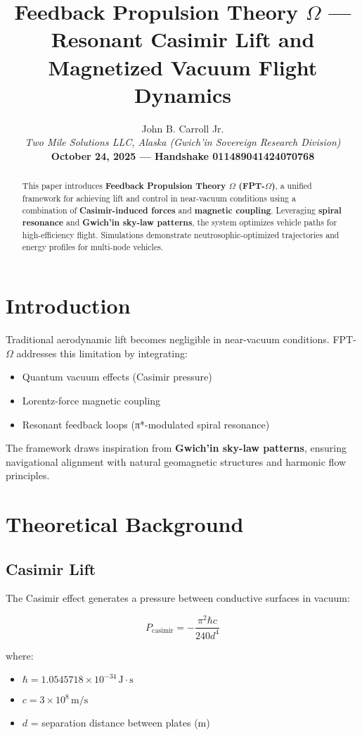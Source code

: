 \documentclass[12pt]{article}
\title{Feedback Propulsion Theory $\Omega$ — Resonant Casimir Lift and Magnetized Vacuum Flight Dynamics}
\author{John B. Carroll Jr.\\
\textit{Two Mile Solutions LLC, Alaska (Gwich’in Sovereign Research Division)}\\
\textbf{October 24, 2025 — Handshake 011489041424070768}}
\date{}
\begin{document}
\maketitle

\begin{abstract}
This paper introduces \textbf{Feedback Propulsion Theory $\Omega$ (FPT-$\Omega$)}, a unified framework for achieving lift and control in near-vacuum conditions using a combination of \textbf{Casimir-induced forces} and \textbf{magnetic coupling}. Leveraging \textbf{spiral resonance} and \textbf{Gwich’in sky-law patterns}, the system optimizes vehicle paths for high-efficiency flight. Simulations demonstrate neutrosophic-optimized trajectories and energy profiles for multi-node vehicles.
\end{abstract}

\section{Introduction}
Traditional aerodynamic lift becomes negligible in near-vacuum conditions. FPT-$\Omega$ addresses this limitation by integrating:

\begin{itemize}
    \item Quantum vacuum effects (Casimir pressure)
    \item Lorentz-force magnetic coupling
    \item Resonant feedback loops (π*-modulated spiral resonance)
\end{itemize}

The framework draws inspiration from \textbf{Gwich’in sky-law patterns}, ensuring navigational alignment with natural geomagnetic structures and harmonic flow principles.

\section{Theoretical Background}

\subsection{Casimir Lift}
The Casimir effect generates a pressure between conductive surfaces in vacuum:

\[
P_\text{casimir} = -\frac{\pi^2 \hbar c}{240 d^4}
\]

where:
\begin{itemize}
    \item $\hbar = 1.0545718 \times 10^{-34}\, \mathrm{J\cdot s}$
    \item $c = 3 \times 10^8\, \mathrm{m/s}$
    \item $d$ = separation distance between plates (m)
\end{itemize}
\end{document}
